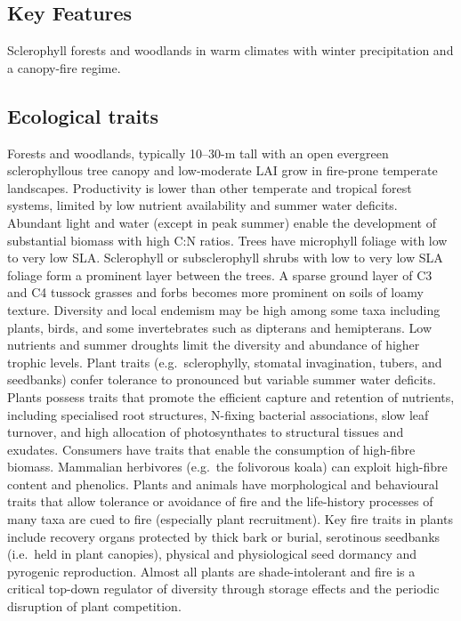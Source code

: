 \documentclass[
  letterpaper,
  DIV=11,
  numbers=noendperiod]{scrartcl}
\begin{document}
\subsection{Key Features}\label{key-features-78}

Sclerophyll forests and woodlands in warm climates with winter
precipitation and a canopy-fire regime.

\subsection{Ecological traits}\label{ecological-traits-78}

Forests and woodlands, typically 10--30-m tall with an open evergreen
sclerophyllous tree canopy and low-moderate LAI grow in fire-prone
temperate landscapes. Productivity is lower than other temperate and
tropical forest systems, limited by low nutrient availability and summer
water deficits. Abundant light and water (except in peak summer) enable
the development of substantial biomass with high C:N ratios. Trees have
microphyll foliage with low to very low SLA. Sclerophyll or
subsclerophyll shrubs with low to very low SLA foliage form a prominent
layer between the trees. A sparse ground layer of C3 and C4 tussock
grasses and forbs becomes more prominent on soils of loamy texture.
Diversity and local endemism may be high among some taxa including
plants, birds, and some invertebrates such as dipterans and hemipterans.
Low nutrients and summer droughts limit the diversity and abundance of
higher trophic levels. Plant traits (e.g.~sclerophylly, stomatal
invagination, tubers, and seedbanks) confer tolerance to pronounced but
variable summer water deficits. Plants possess traits that promote the
efficient capture and retention of nutrients, including specialised root
structures, N-fixing bacterial associations, slow leaf turnover, and
high allocation of photosynthates to structural tissues and exudates.
Consumers have traits that enable the consumption of high-fibre biomass.
Mammalian herbivores (e.g.~the folivorous koala) can exploit high-fibre
content and phenolics. Plants and animals have morphological and
behavioural traits that allow tolerance or avoidance of fire and the
life-history processes of many taxa are cued to fire (especially plant
recruitment). Key fire traits in plants include recovery organs
protected by thick bark or burial, serotinous seedbanks (i.e.~held in
plant canopies), physical and physiological seed dormancy and pyrogenic
reproduction. Almost all plants are shade-intolerant and fire is a
critical top-down regulator of diversity through storage effects and the
periodic disruption of plant competition.
\end{document}
